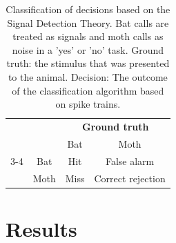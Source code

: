 \documentclass[12pt,a4paper]{article}
\begin{document}
\begin{table}[h]
	\centering
	\caption{Classification of decisions based on the Signal Detection Theory. Bat calls are treated as signals and moth calls as noise in a 'yes' or 'no' task. Ground truth: the stimulus that was presented to the animal. Decision: The outcome of the classification algorithm based on spike trains.}
	\setlength{\tabcolsep}{10pt} %
	\renewcommand{\arraystretch}{1.5} %
	\label{tab:yesno}
	\begin{tabular}{llcc}
		&                                                   & \multicolumn{2}{c}{\cellcolor[HTML]{C0C0C0}\textbf{Ground truth}} \\
		&                                                   & \cellcolor[HTML]{C0C0C0}Bat     & \cellcolor[HTML]{C0C0C0}Moth    \\ \cline{3-4} 
		\multicolumn{1}{c}{\cellcolor[HTML]{C0C0C0}{\color[HTML]{000000} }}                                    & \multicolumn{1}{c|}{\cellcolor[HTML]{C0C0C0}Bat}  & Hit                             & False alarm                     \\
		\multicolumn{1}{c}{\multirow{-2}{*}{\cellcolor[HTML]{C0C0C0}{\color[HTML]{000000} \textbf{Decision}}}} & \multicolumn{1}{c|}{\cellcolor[HTML]{C0C0C0}Moth} & Miss                            & Correct rejection              
	\end{tabular}
\end{table}


\newpage
\section{Results}
\end{document}
